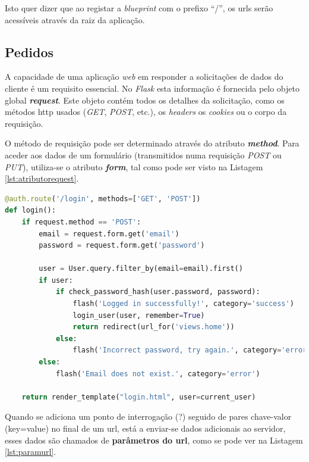 Isto quer dizer que ao registar a \textit{blueprint} com o prefixo ``/'', os \acrshort{url}s serão acessíveis através da raiz da aplicação.

\subsection{Pedidos}
A capacidade de uma aplicação \textit{web} em responder a solicitações de dados do cliente é um requisito essencial. No \textit{Flask} esta informação é fornecida pelo objeto global \textit{\textbf{request}}. Este objeto contém todos os detalhes da solicitação, como os métodos \acrshort{http} usados (\textit{GET}, \textit{POST}, etc.), os \textit{headers} os \textit{cookies} ou o corpo da requisição.

O método de requisição pode ser determinado através do atributo \textit{\textbf{method}}. Para aceder aos dados de um formulário (transmitidos numa requisição \textit{POST} ou \textit{PUT}), utiliza-se o atributo \textit{\textbf{form}}, tal como pode ser visto na Listagem \ref{lst:atributorequest}.

\begin{minipage}{0.9\linewidth}
	\begin{lstlisting}[language=Python, caption=Exemplo atributo \textit{\textbf{request} - \textit{auth.py}}, label=lst:atributorequest]
@auth.route('/login', methods=['GET', 'POST'])
def login():
    if request.method == 'POST':
        email = request.form.get('email')
        password = request.form.get('password')

        user = User.query.filter_by(email=email).first()
        if user:
            if check_password_hash(user.password, password):
                flash('Logged in successfully!', category='success')
                login_user(user, remember=True)
                return redirect(url_for('views.home'))
            else:
                flash('Incorrect password, try again.', category='error')
        else:
            flash('Email does not exist.', category='error')

    return render_template("login.html", user=current_user)
\end{lstlisting}
\end{minipage}

Quando se adiciona um ponto de interrogação (?) seguido de pares chave-valor (key=value) no final de um \acrshort{url}, está a enviar-se dados adicionais ao servidor, esses dados são chamados de \textbf{parâmetros do \acrshort{url}}, como se pode ver na Listagem \ref{lst:paramurl}.

